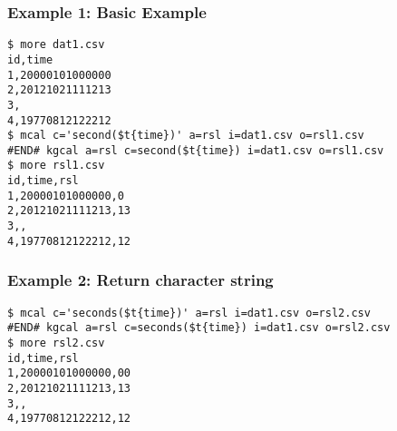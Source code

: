 \subsubsection*{Example 1: Basic Example}



\begin{Verbatim}[baselinestretch=0.7,frame=single]
$ more dat1.csv
id,time
1,20000101000000
2,20121021111213
3,
4,19770812122212
$ mcal c='second($t{time})' a=rsl i=dat1.csv o=rsl1.csv
#END# kgcal a=rsl c=second($t{time}) i=dat1.csv o=rsl1.csv
$ more rsl1.csv
id,time,rsl
1,20000101000000,0
2,20121021111213,13
3,,
4,19770812122212,12
\end{Verbatim}
\subsubsection*{Example 2: Return character string}



\begin{Verbatim}[baselinestretch=0.7,frame=single]
$ mcal c='seconds($t{time})' a=rsl i=dat1.csv o=rsl2.csv
#END# kgcal a=rsl c=seconds($t{time}) i=dat1.csv o=rsl2.csv
$ more rsl2.csv
id,time,rsl
1,20000101000000,00
2,20121021111213,13
3,,
4,19770812122212,12
\end{Verbatim}
